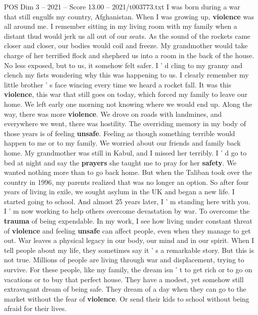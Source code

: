 \begin{textsample}{POS Dim 3 – 2021 – Score 13.00 – 2021/t003773.txt}  \label{ex:f3_pos_031}
I was born during a war that still engulfs my country, Afghanistan.
When I was growing up, \textbf{violence} was all around me.
I remember sitting in my living room with my family when a distant thud would jerk us all out of our seats.
As the sound of the rockets came closer and closer, our bodies would coil and freeze.
My grandmother would take charge of her terrified flock and shepherd us into a room in the back of the house.
No less exposed, but to us, it somehow felt safer.
I ' d cling to my granny and clench my fists wondering why this was happening to us.
I clearly remember my little brother ' s face wincing every time we heard a rocket fall.
It was this \textbf{violence}, this war that still goes on today, which forced my family to leave our home.
We left early one morning not knowing where we would end up.
Along the way, there was more \textbf{violence}.
We drove on roads with landmines, and everywhere we went, there was hostility.
The overriding memory in my body of those years is of feeling \textbf{unsafe}.
Feeling as though something terrible would happen to me or to my family.
We worried about our friends and family back home.
My grandmother was still in Kabul, and I missed her terribly.
I ' d go to bed at night and say the \textbf{prayers} she taught me to pray for her \textbf{safety}.
We wanted nothing more than to go back home.
But when the Taliban took over the country in 1996, my parents realized that was no longer an option.
So after four years of living in exile, we sought asylum in the UK and began a new life.
I started going to school.
And almost 25 years later, I ' m standing here with you.
I ' m now working to help others overcome devastation by war.
To overcome the \textbf{trauma} of being expendable.
In my work, I see how living under constant threat of \textbf{violence} and feeling \textbf{unsafe} can affect people, even when they manage to get out.
War leaves a physical legacy in our body, our mind and in our spirit.
When I tell people about my life, they sometimes say it ' s a remarkable story.
But this is not true.
Millions of people are living through war and displacement, trying to survive.
For these people, like my family, the dream isn ' t to get rich or to go on vacations or to buy that perfect house.
They have a modest, yet somehow still extravagant dream of being safe.
They dream of a day when they can go to the market without the fear of \textbf{violence}.
Or send their kids to school without being afraid for their lives.

\end{textsample}
